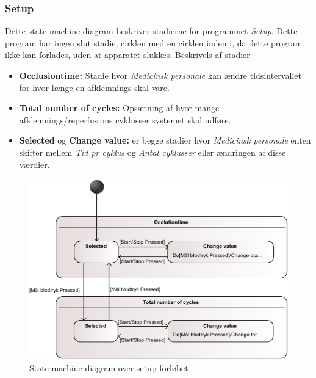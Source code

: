 \subsubsection{Setup}
Dette state machine diagram beskriver stadierne for programmet \textit{Setup}. Dette program har ingen slut stadie, cirklen med en cirklen inden i, da dette program ikke kan forlades, uden at apparatet slukkes. Beskrivels af stadier 
\begin{itemize}
	\item \textbf{Occlusiontime:} Stadie hvor \textit{Medicinsk personale} kan ændre tidsintervallet for hvor længe en afklemnings skal vare. 
	\item \textbf{Total number of cycles:} Opsætning af hvor mange afklemnings/reperfusions cyklusser systemet skal udføre. 
	\item \textbf{Selected} og \textbf{Change value:} er begge stadier hvor \textit{Medicinsk personale} enten skifter mellem \textit{Tid pr cyklus} og \textit{Antal cyklusser} eller ændringen af disse værdier.
	
\end{itemize}
\begin{figure}[H]
	\includegraphics[width=\textwidth]{SystemArkitektur/pdfs/STM_Setup-crop.pdf}
	\caption{State machine diagram over setup forløbet}
\end{figure}

